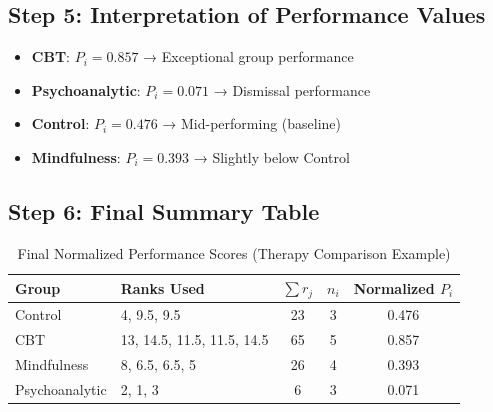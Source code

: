 \documentclass[a4paper,fleqn,review]{cas-sc}
\begin{document}
\vspace{1em}

\subsection*{Step 5: Interpretation of Performance Values}

\begin{itemize}
	\item \textbf{CBT}: $P_i = 0.857$ → Exceptional group performance
	\item \textbf{Psychoanalytic}: $P_i = 0.071$ → Dismissal performance
	\item \textbf{Control}: $P_i = 0.476$ → Mid-performing (baseline)
	\item \textbf{Mindfulness}: $P_i = 0.393$ → Slightly below Control
\end{itemize}

\vspace{1em}

\subsection*{Step 6: Final Summary Table}

\begin{table}[!htbp]
	\centering
	\renewcommand{\arraystretch}{1.3}
	\begin{tabular}{|l|l|c|c|c|}
		\hline
		\textbf{Group} & \textbf{Ranks Used} & $\sum r_j$ & $n_i$ & \textbf{Normalized $P_i$} \\
		\hline
		Control & 4, 9.5, 9.5 & 23 & 3 & 0.476 \\
		CBT & 13, 14.5, 11.5, 11.5, 14.5 & 65 & 5 & 0.857 \\
		Mindfulness & 8, 6.5, 6.5, 5 & 26 & 4 & 0.393 \\
		Psychoanalytic & 2, 1, 3 & 6 & 3 & 0.071 \\
		\hline
	\end{tabular}
	\caption{Final Normalized Performance Scores (Therapy Comparison Example)}
\end{table}

\pagebreak


\appendix
\end{document}
